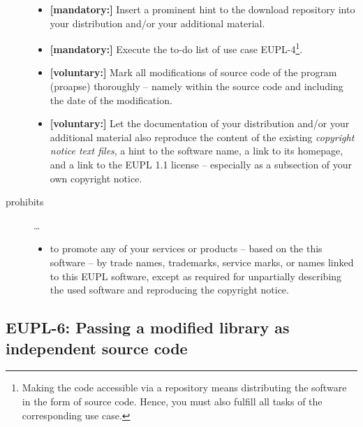 \begin{description}
\begin{itemize}
  \item \textbf{[mandatory:]} Insert a prominent hint to the download repository
  into your distribution and/or your additional material.
    
  \item \textbf{[mandatory:]} Execute the to-do list of use case EUPL-4\footnote{
  Making the code accessible via a repository means distributing the software in
  the form of source code. Hence, you must also fulfill all tasks of the
  corresponding use case.}.
  
  \item \textbf{[voluntary:]} Mark all modifications of source code of the
  program (proapse) thoroughly -- namely within the
  source code and including the date of the modification.
 
  \item \textbf{[voluntary:]} Let the documentation of your distribution and/or
  your additional material  also reproduce the content of the existing
  \emph{copyright notice text files}, a hint to the software name, a link to its
  homepage, and a link to the EUPL 1.1 license -- especially as a subsection of
  your own copyright notice.


\end{itemize}

\item[prohibits] \ldots
\begin{itemize}
  \item to promote any of your services or products -- based on the this software
  -- by trade names, trademarks, service marks, or names linked to this EUPL
  software, except as required for unpartially describing the used software and
  reproducing the copyright notice.
\end{itemize}

\end{description}

\subsection{EUPL-6: Passing a modified library as independent source code}
\label{OSUC-08-EUPL}

